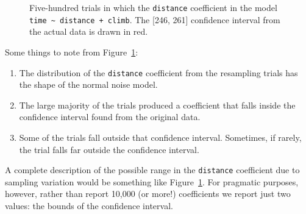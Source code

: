 \documentclass[
  letterpaper,
  DIV=11,
  numbers=noendperiod,
  oneside]{scrartcl}
\providecommand{\tightlist}{%
  \setlength{\itemsep}{0pt}\setlength{\parskip}{0pt}}\usepackage{longtable,booktabs,array}
\begin{document}
\begin{figure}[H]


\caption{\label{fig-500-coefficients}Five-hundred trials in which the
\texttt{distance} coefficient in the model
\texttt{time\ \textasciitilde{}\ distance\ +\ climb}. The {[}246, 261{]}
confidence interval from the actual data is drawn in red.}

\end{figure}%

Some things to note from Figure~\ref{fig-500-coefficients}:

\begin{enumerate}
\def\labelenumi{\arabic{enumi}.}
\tightlist
\item
  The distribution of the \texttt{distance} coefficient from the
  resampling trials has the shape of the normal noise model.
\item
  The large majority of the trials produced a coefficient that falls
  inside the confidence interval found from the original data.
\item
  Some of the trials fall outside that confidence interval. Sometimes,
  if rarely, the trial falls far outside the confidence interval.
\end{enumerate}

A complete description of the possible range in the \texttt{distance}
coefficient due to sampling variation would be something like
Figure~\ref{fig-500-coefficients}. For pragmatic purposes, however,
rather than report 10,000 (or more!) coefficients we report just two
values: the bounds of the confidence interval.
\end{document}

